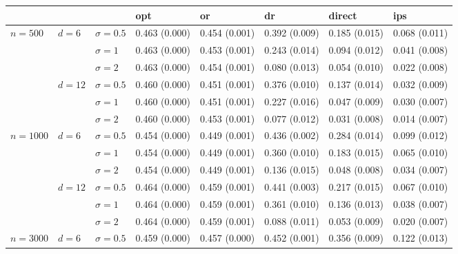 \documentclass[11pt]{article} %
\theoremstyle{theorem}  %
\theoremstyle{plain}
\begin{document}
\begin{figure}[H]
\scriptsize
\centering
\begin{tabular}{llllllll}
\toprule
         &        &            &            opt &             or &             dr &         direct &            ips \\
\midrule
\multirow{6}{*}{$n=500$} & \multirow{3}{*}{$d=6$} & $\sigma=0.5$ &  0.463 (0.000) &  0.454 (0.001) &  0.392 (0.009) &  0.185 (0.015) &  0.068 (0.011) \\
         &        & $\sigma=1$ &  0.463 (0.000) &  0.453 (0.001) &  0.243 (0.014) &  0.094 (0.012) &  0.041 (0.008) \\
         &        & $\sigma=2$ &  0.463 (0.000) &  0.454 (0.001) &  0.080 (0.013) &  0.054 (0.010) &  0.022 (0.008) \\
\cline{2-8}
         & \multirow{3}{*}{$d=12$} & $\sigma=0.5$ &  0.460 (0.000) &  0.451 (0.001) &  0.376 (0.010) &  0.137 (0.014) &  0.032 (0.009) \\
         &        & $\sigma=1$ &  0.460 (0.000) &  0.451 (0.001) &  0.227 (0.016) &  0.047 (0.009) &  0.030 (0.007) \\
         &        & $\sigma=2$ &  0.460 (0.000) &  0.453 (0.001) &  0.077 (0.012) &  0.031 (0.008) &  0.014 (0.007) \\
\cline{1-8}
\cline{2-8}
\multirow{6}{*}{$n=1000$} & \multirow{3}{*}{$d=6$} & $\sigma=0.5$ &  0.454 (0.000) &  0.449 (0.001) &  0.436 (0.002) &  0.284 (0.014) &  0.099 (0.012) \\
         &        & $\sigma=1$ &  0.454 (0.000) &  0.449 (0.001) &  0.360 (0.010) &  0.183 (0.015) &  0.065 (0.010) \\
         &        & $\sigma=2$ &  0.454 (0.000) &  0.449 (0.001) &  0.136 (0.015) &  0.048 (0.008) &  0.034 (0.007) \\
\cline{2-8}
         & \multirow{3}{*}{$d=12$} & $\sigma=0.5$ &  0.464 (0.000) &  0.459 (0.001) &  0.441 (0.003) &  0.217 (0.015) &  0.067 (0.010) \\
         &        & $\sigma=1$ &  0.464 (0.000) &  0.459 (0.001) &  0.361 (0.010) &  0.136 (0.013) &  0.038 (0.007) \\
         &        & $\sigma=2$ &  0.464 (0.000) &  0.459 (0.001) &  0.088 (0.011) &  0.053 (0.009) &  0.020 (0.007) \\
\cline{1-8}
\cline{2-8}
\multirow{6}{*}{$n=3000$} & \multirow{3}{*}{$d=6$} & $\sigma=0.5$ &  0.459 (0.000) &  0.457 (0.000) &  0.452 (0.001) &  0.356 (0.009) &  0.122 (0.013) \\

\end{tabular}
\end{figure}
\end{document}
